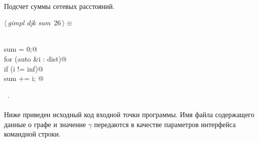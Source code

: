 \documentclass[12pt]{article}
\begin{document}
\paragraph{}
Подсчет суммы сетевых расстояний.
\begin{flushleft} \small
\begin{minipage}{\linewidth}\label{scrap42}\raggedright\small
{} $\langle\,${\itshape gimpl djk sum}\nobreak\ {\footnotesize {26}}$\,\rangle\equiv$
\vspace{-1ex}
\begin{list}{}{} \item
\mbox{}\verb@@\\
\mbox{}\verb@double sum = 0;@\\
\mbox{}\verb@    for (auto &i : dist)@\\
\mbox{}\verb@        if (i != inf)@\\
\mbox{}\verb@            sum += i; @\\
\mbox{}\verb@@{\NWsep}
\end{list}
\vspace{-1.5ex}
\footnotesize
\begin{list}{}{\setlength{\itemsep}{-\parsep}\setlength{\itemindent}{-\leftmargin}}
\item \NWtxtMacroRefIn\ .

\item{}
\end{list}
\end{minipage}\vspace{4ex}
\end{flushleft}
\paragraph{}
Ниже приведен исходный код входной точки программы. 
Имя файла содержащего данные о графе и значение 
$\gamma$ передаются в качестве параметров интерфейса командной строки.
\end{document}
